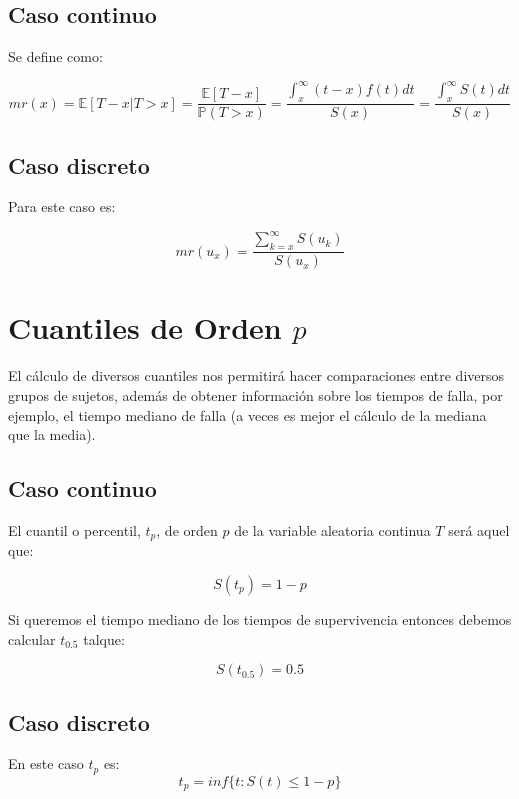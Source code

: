 \documentclass[
  a4paper,
  oneside,
  openany]{book}
\begin{document}
\hypertarget{caso-continuo-5}{%
\subsection*{Caso continuo}\label{caso-continuo-5}}


Se define como:

\[
mr(x)=\mathbb{E}[T-x|T>x]=\frac{\mathbb{E}[T-x]}{\mathbb{P}(T>x)}=\frac{\int_x^{\infty}(t-x)f(t)dt}{S(x)}=\frac{\int_x^{\infty}S(t)dt}{S(x)}
\]

\hypertarget{caso-discreto-5}{%
\subsection*{Caso discreto}\label{caso-discreto-5}}


Para este caso es:

\[
mr(u_x)=\frac{\sum_{k=x}^{\infty}S(u_k)}{S(u_x)}
\]

\hypertarget{cuantiles-de-orden-p}{%
\section{\texorpdfstring{Cuantiles de Orden \(p\)}{Cuantiles de Orden p}}\label{cuantiles-de-orden-p}}

El cálculo de diversos cuantiles nos permitirá hacer comparaciones entre diversos grupos de sujetos, además de obtener información sobre los tiempos de falla, por ejemplo, el tiempo mediano de falla (a veces es mejor el cálculo de la mediana que la media).

\hypertarget{caso-continuo-6}{%
\subsection*{Caso continuo}\label{caso-continuo-6}}


El cuantil o percentil, \(t_p\), de orden \(p\) de la variable aleatoria continua \(T\) será aquel que:

\[
S(t_p)=1-p
\]

Si queremos el tiempo mediano de los tiempos de supervivencia entonces debemos calcular \(t_{0.5}\) talque:

\[
S(t_{0.5})=0.5
\]

\hypertarget{caso-discreto-6}{%
\subsection*{Caso discreto}\label{caso-discreto-6}}


En este caso \(t_p\) es:
\[
t_p=inf\{t: S(t) \leq  1-p\}
\]
\end{document}
